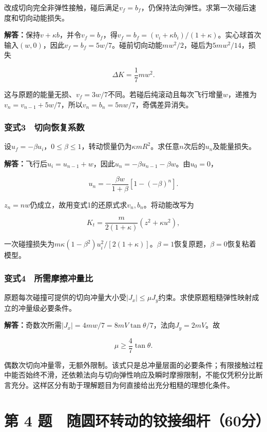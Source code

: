 \documentclass[12pt,a4paper,fontset=fandol]{ctexart}
\begin{document}
改成切向完全非弹性接触，碰后满足\(v_f=b_f\)，仍保持法向弹性。求第一次碰后速度和切向动能损失。

\textbf{解答：}保持\(v+\kappa b\)，并令\(v_f=b_f\)，得\(v_f=b_f=(v_i+\kappa b_i)/(1+\kappa)\)。实心球首次输入\((w,0)\)，因此\(v_f=b_f=5w/7\)。碰前切向动能\(mw^2/2\)，碰后为\(5mw^2/14\)，损失

\[
\Delta K=\frac17mw^2.
\]

这与原题的能量无损、\(v_f=3w/7\)不同。若碰后纯滚动且每次飞行增量\(w\)，递推为\(v_n=v_{n-1}+5w/7\)，所以\(v_n=b_n=5nw/7\)，奇偶差异消失。

\subsubsection{变式3　切向恢复系数}\label{ux53d8ux5f0f3-ux5207ux5411ux6062ux590dux7cfbux6570}

设\(u_f=-\beta u_i\)，\(0\leq\beta\leq1\)，转动惯量仍为\(\kappa mR^2\)。求任意\(n\)次后的\(u_n\)及能量损失。

\textbf{解答：}飞行后\(u_i=u_{n-1}+w\)，因此\(u_n=-\beta u_{n-1}-\beta w\)。由\(u_0=0\)，

\[
u_n=-\frac{\beta w}{1+\beta}[1-(-\beta)^n].
\]

\(z_n=nw\)仍成立，故用变式1的还原式求\(v_n,b_n\)。将动能改写为

\[
K_t=\frac{m}{2(1+\kappa)}(z^2+\kappa u^2),
\]

一次碰撞损失为\(m\kappa(1-\beta^2)u_i^2/[2(1+\kappa)]\)。\(\beta=1\)恢复原题，\(\beta=0\)恢复粘着模型。

\subsubsection{变式4　所需摩擦冲量比}\label{ux53d8ux5f0f4-ux6240ux9700ux6469ux64e6ux51b2ux91cfux6bd4}

原题每次碰撞可提供的切向冲量大小受\(\lvert J_x\rvert\leq\mu J_y\)约束。求使原题粗糙弹性映射成立的冲量级必要条件。

\textbf{解答：}奇数次所需\(\lvert J_x\rvert=4mw/7=8mV\tan\theta/7\)，法向\(J_y=2mV\)。故

\[
\mu\geq\frac47\tan\theta.
\]

偶数次切向冲量零，无额外限制。该式只是总冲量层面的必要条件；有限接触过程中能否始终不滑，还依赖法向与切向弹性响应及瞬时摩擦限制，不能仅凭积分比断言充分。这样区分有助于理解题目为何直接给出充分粗糙的理想化条件。

\clearpage

\section{第 4
题　随圆环转动的铰接细杆（60分）}\label{ux7b2c-4-ux9898-ux968fux5706ux73afux8f6cux52a8ux7684ux94f0ux63a5ux7ec6ux674660ux5206}
\end{document}
